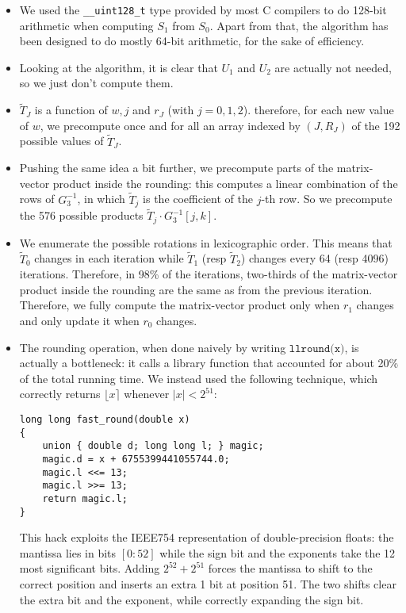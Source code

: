 \documentclass[submission,svgnames,journal=tosc]{iacrtrans}
\begin{document}
\begin{itemize}
\item We used the \verb|__uint128_t| type provided by most \textsf{C} compilers
  to do 128-bit arithmetic when computing $S_1$ from $S_0$. Apart from that, the
  algorithm has been designed to do mostly 64-bit arithmetic, for the sake of
  efficiency.
  
\item Looking at the algorithm, it is clear that $U_1$ and $U_2$ are actually
  not needed, so we just don't compute them.
  
\item $\widetilde{T}_J$ is a function of $w, j$ and $r_J$ (with
  $j=0,1,2$). therefore, for each new value of $w$, we precompute once and for
  all an array indexed by $(J, R_J)$ of the 192 possible values of
  $\widetilde{T}_J$.

\item Pushing the same idea a bit further, we precompute parts of the
  matrix-vector product inside the rounding: this computes a linear combination
  of the rows of $G_3^{-1}$, in which $\widetilde{T}_j$ is the coefficient of
  the $j$-th row. So we precompute the 576 possible products $\widetilde{T}_j \cdot G_3^{-1}[j, k]$.

\item We enumerate the possible rotations in lexicographic order. This means
  that $\widetilde{T}_0$ changes in each iteration while $\widetilde{T}_1$ (resp
  $\widetilde{T}_2$) changes every 64 (resp 4096) iterations. Therefore, in 98\%
  of the iterations, two-thirds of the matrix-vector product inside the rounding
  are the same as from the previous iteration. Therefore, we fully compute the
  matrix-vector product only when $r_1$ changes and only update it when $r_0$
  changes.

\item The rounding operation, when done naively by writing
  $\texttt{llround(x)}$, is actually a bottleneck: it calls a library function
  that accounted for about 20\% of the total running time. We instead used the
  following technique, which correctly returns $\lfloor x \rceil$ whenever
  $|x| < 2^{51}$:
  \begin{verbatim}
long long fast_round(double x)
{
    union { double d; long long l; } magic; 
    magic.d = x + 6755399441055744.0;
    magic.l <<= 13; 
    magic.l >>= 13;
    return magic.l;
}
\end{verbatim}
This hack exploits the IEEE754 representation of double-precision floats: the
mantissa lies in bits $[0:52]$ while the sign bit and the exponents take the 12
most significant bits. Adding $2^{52}+2^{51}$ forces the mantissa to shift to
the correct position and inserts an extra 1 bit at position 51. The two shifts
clear the extra bit and the exponent, while correctly expanding the sign bit.
\end{itemize}
\end{document}
